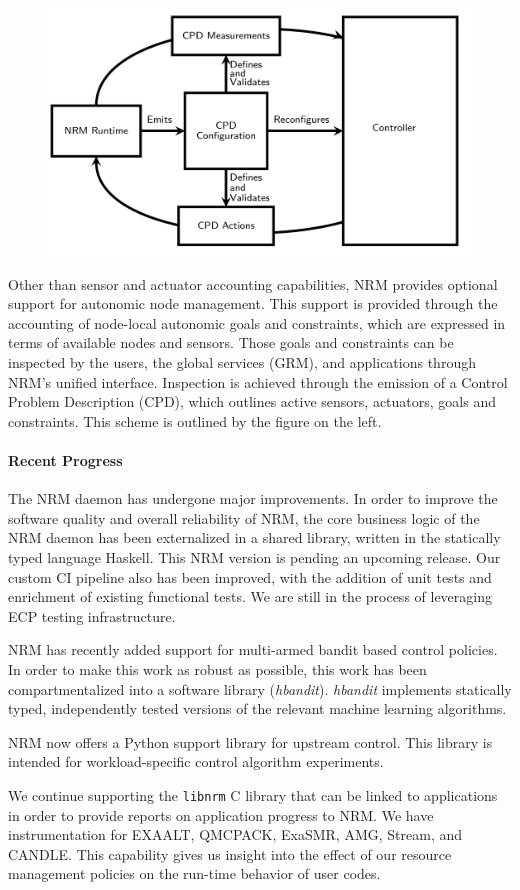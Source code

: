 \begin{figure}
\includegraphics[width=.38\textwidth]{projects/2.3.1-PMR/2.3.1.19-Argo-PowerSteering/cpd}
\end{figure}
Other than sensor and actuator accounting capabilities, NRM provides
optional support for autonomic node management. This support is provided through
the accounting of node-local autonomic goals and constraints, which are
expressed in terms of available nodes and sensors. Those goals and
constraints can be inspected by the users, the global services (GRM), and
applications through NRM's unified interface. Inspection is achieved through
the emission of a Control Problem Description (CPD), which outlines active
sensors, actuators, goals and constraints. This scheme is outlined by the
figure on the left.

\paragraph{Recent Progress}

The NRM daemon has undergone major improvements. In order to improve the
software quality and overall reliability of NRM, the core business logic
of the NRM daemon has been externalized in a shared library, written in the
statically typed language Haskell. This NRM version is pending an upcoming
release. Our custom CI pipeline also has been improved, with the addition
of unit tests and enrichment of existing functional tests. We are still in
the process of leveraging ECP testing infrastructure.

NRM has recently added support for multi-armed bandit based control policies.
In order to make this work as robust as possible, this work has been
compartmentalized into a software library (\textit{hbandit}). \textit{hbandit}
implements statically typed, independently tested versions of the relevant
machine learning algorithms.

NRM now offers a Python support library for upstream control. This library is
intended for workload-specific control algorithm experiments.

We continue supporting the \texttt{libnrm} C library that can be linked to
applications in order to provide reports on application progress to NRM. We have
instrumentation for EXAALT, QMCPACK, ExaSMR, AMG, Stream, and CANDLE.
This capability gives us insight into the effect of our resource management
policies on the run-time behavior of user codes.

